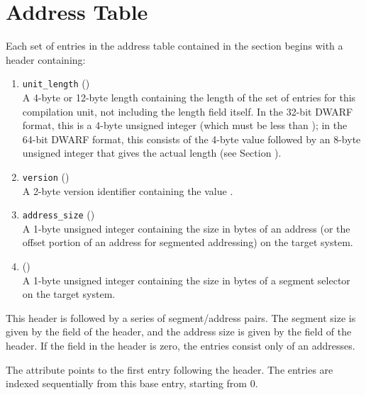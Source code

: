 \section{Address Table}
\label{chap:addresstable}
Each set of entries in the address table contained in the
\dotdebugaddr{} section begins with a header containing:
\begin{enumerate}[1. ]
\item \texttt{unit\_length} () \\
A 4-byte or 12-byte length containing the length of
the set of entries for this compilation unit, not
including the length field itself. In the 32-bit
DWARF format, this is a 4-byte unsigned integer
(which must be less than \xfffffffzero); in the 64-bit
DWARF format, this consists of the 4-byte value
\wffffffff followed by an 8-byte unsigned integer
that gives the actual length (see 
Section ).

\item  \texttt{version} (\HFTuhalf) \\
A 2-byte version identifier containing the value
\versiondotdebugaddr{}.

\item	\texttt{address\_size} (\HFTubyte) \\
A 1-byte unsigned integer containing the size in
bytes of an address (or the offset portion of an
address for segmented addressing) on the target
system.

\item	\HFNsegmentselectorsize{} (\HFTubyte) \\
A 1-byte unsigned integer containing the size in
bytes of a segment selector on the target system.
\end{enumerate}

This header is followed by a series of segment/address pairs.
The segment size is given by the \HFNsegmentselectorsize{} field of the
header, and the address size is given by the 
field of the header. If the \HFNsegmentselectorsize{} field in the header
is zero, the entries consist only of an addresses.

The \DWATaddrbase{} attribute points to the first entry
following the header. The entries are indexed sequentially
from this base entry, starting from 0.

